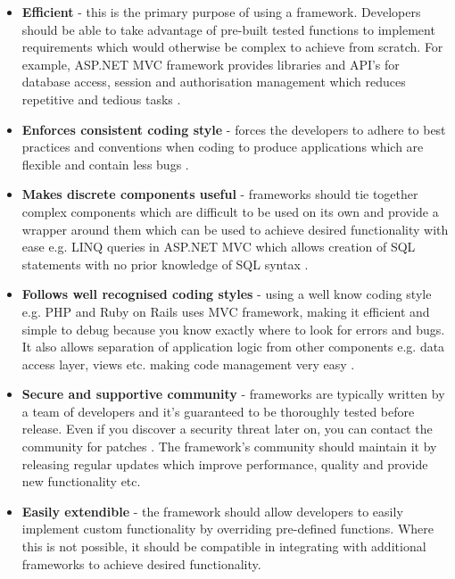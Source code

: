 \begin{itemize}
    \item \textbf{Efficient} - this is the primary purpose of using a framework. Developers should be able to take advantage of pre-built tested functions to implement requirements which would otherwise be complex to achieve from scratch. For example, ASP.NET MVC framework provides libraries and API’s for database access, session and authorisation management which reduces repetitive and tedious tasks \cite{asp.net-team}.
    \item \textbf{Enforces consistent coding style} - forces the developers to adhere to best practices and conventions when coding to produce applications which are flexible and contain less bugs \cite{cimetrix}.
    \item \textbf{Makes discrete components useful} - frameworks should tie together complex components which are difficult to be used on its own and provide a wrapper around them which can be used to achieve desired functionality with ease e.g. LINQ queries in ASP.NET MVC which allows creation of SQL statements with no prior knowledge of SQL syntax \cite{social-msdn}.
    \item \textbf{Follows well recognised coding styles} - using a well know coding style e.g. PHP and Ruby on Rails uses MVC framework, making it efficient and simple to debug because you know exactly where to look for errors and bugs. It also allows separation of application logic from other components e.g. data access layer, views etc. making code management very easy \cite{speckyboy}.
	\item \textbf{Secure and supportive community} - frameworks are typically written by a team of developers and it’s guaranteed to be thoroughly tested before release. Even if you discover a security threat later on, you can contact the community for patches \cite{OSTraining}. The framework’s community should maintain it by releasing regular updates which improve performance, quality and provide new functionality etc. \cite{cimetrix}
	\item \textbf{Easily extendible} - the framework should allow developers to easily implement custom functionality by overriding pre-defined functions. Where this is not possible, it should be compatible in integrating with additional frameworks to achieve desired functionality.
\end{itemize}

